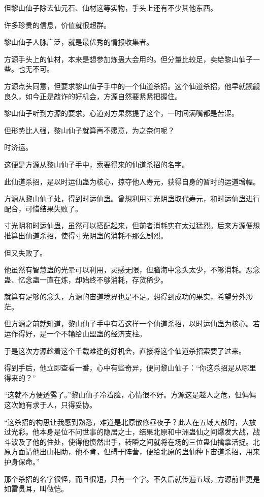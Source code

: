 \begin{this_body}
但黎山仙子除去仙元石、仙材这等实物，手头上还有不少其他东西。

许多珍贵的信息，价值就很超群。

黎山仙子人脉广泛，就是最优秀的情报收集者。

方源手头上的仙材，本来是想参加炼蛊大会用的。但分量比较足，卖给黎山仙子一些。也无不可。

方源点头同意，但要求黎山仙子手中的一个仙道杀招。这个仙道杀招，他早就觊觎良久，如今正是敲诈的好机会，方源自然要紧紧把握住。

黎山仙子听到方源的要求，心道对方果然提了这个，一时间满嘴都是苦涩。

但形势比人强，黎山仙子就算再不愿意，为之奈何呢？

时济运。

这便是方源从黎山仙子手中，索要得来的仙道杀招的名字。

此仙道杀招，是以时运仙蛊为核心，掠夺他人寿元，获得自身的暂时的运道增幅。

方源从黎山仙子处，得到时运仙蛊。曾想利用寸光阴蛊取代寿元，和时运仙蛊进行配合，可惜结果失败了。

寸光阴和时运仙蛊，虽然可以搭配起来，但前者消耗实在太过猛烈。后来方源便想推算出仙道杀招，使得寸光阴蛊的消耗不那么剧烈。

但又失败了。

他虽然有智慧蛊的光晕可以利用，灵感无限，但脑海中念头太少，不够消耗。恶念蛊、忆念蛊一直在炼，却始终不够消耗，存货稀少。

就算有足够的念头，方源的宙道境界也是不足。想得到成功的果实，希望分外渺茫。

但方源之前就知道，黎山仙子手中有着这样一个仙道杀招，以时运仙蛊为核心。若运作得好，是一个不输给山盟蛊的经济支柱。

于是这次方源趁着这个千载难逢的好机会，直接将这个仙道杀招索要了过来。

得到手后，他立即查看一番，心中有些奇异，便问黎山仙子：“你这杀招是从哪里得来的？”

“这就不方便透露了。”黎山仙子冷着脸，心情很不好。方源这是趁人之危，但偏偏这次她有求于人，只得妥协。

“这杀招的构思让我感到熟悉，难道是北原散修昼夜子？此人在五域大战时，大放过光彩。他本身是位不问世事的隐居之士，结果北原和中洲蛊仙之间爆发大战，战斗波及了他的住处，使得他愤然出手，转瞬之间就将在场的三位蛊仙擒拿活捉。北原方面请他出山相助，他不肯，但碍于阵营，便给北原的蛊仙种下宙道杀招，用来护身保命。”

那个杀招的名字很怪，而且很短，只有一个字。不久后就传遍五域，方源前世更是如雷贯耳，叫做恺。


\end{this_body}
